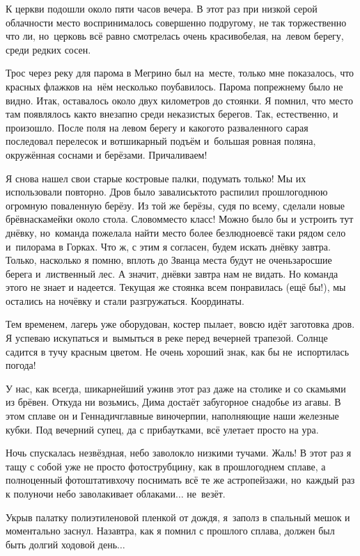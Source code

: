 К церкви подошли около пяти часов вечера. В этот раз при низкой серой облачности место воспринималось совершенно по\sdash другому, не так торжественно что ли, но~церковь всё равно смотрелась очень красиво\mdash белая, на~левом берегу, среди редких сосен.
 
Трос через реку для парома в Мегрино был на~месте, только мне показалось, что красных флажков на~нём несколько поубавилось. Парома по\sdash прежнему было не видно. Итак, оставалось около двух километров до стоянки. Я помнил, что место там появлялось как\sdash то внезапно среди неказистых берегов. Так, естественно, и произошло. После поля на левом берегу и какого\sdash то разваленного сарая последовал перелесок и вот\mdash шикарный подъём и~большая ровная поляна, окружённая соснами и берёзами. Причаливаем! 

Я снова нашел свои старые костровые палки, подумать только! Мы их использовали повторно. Дров было завались\mdash кто\sdash то распилил прошлогоднюю огромную поваленную берёзу. Из той же берёзы, судя по всему, сделали новые брёвна\sdash скамейки около стола. Словом\mdash место класс! Можно было бы и устроить тут днёвку, но~команда пожелала найти место более безлюдное\mdash всё таки рядом село и~пилорама в Горках. Что ж, с этим я согласен, будем искать днёвку завтра. Только, насколько я помню, вплоть до Званца места будут не очень\mdash заросшие берега и~лиственный лес. А значит, днёвки завтра нам не видать. Но команда этого не знает и надеется. Текущая же стоянка всем понравилась (ещё бы!), мы остались на ночёвку и стали разгружаться. Координаты\mdash \CoordsChagodoschaMegrino.

Тем временем, лагерь уже оборудован, костер пылает, вовсю идёт заготовка дров. Я успеваю искупаться и~вымыться в реке перед вечерней трапезой. Солнце садится в тучу красным цветом. Не очень хороший знак, как бы не~испортилась погода!  

У нас, как всегда, шикарнейший ужин\mdash в этот раз даже на столике и со скамьями из брёвен. Откуда ни возьмись, Дима достаёт забугорное снадобье из агавы. В этом сплаве он и Геннадич\mdash главные виночерпии, наполняющие наши железные кубки. Под вечерний супец, да с прибаутками, всё улетает просто на ура. 

Ночь спускалась незвёздная, небо заволокло низкими тучами. Жаль! В этот раз я тащу с собой уже не просто фотострубцину, как в прошлогоднем сплаве, а полноценный фотоштатив\mdash хочу поснимать всё те же астропейзажи, но~каждый раз к полуночи небо заволакивает облаками$\ldots$ не~везёт.

Укрыв палатку полиэтиленовой пленкой от дождя, я~заполз в спальный мешок и моментально заснул. Назавтра, как я помнил с прошлого сплава, должен был быть долгий ходовой день$\ldots$ 

\begin{center}
\end{center}
